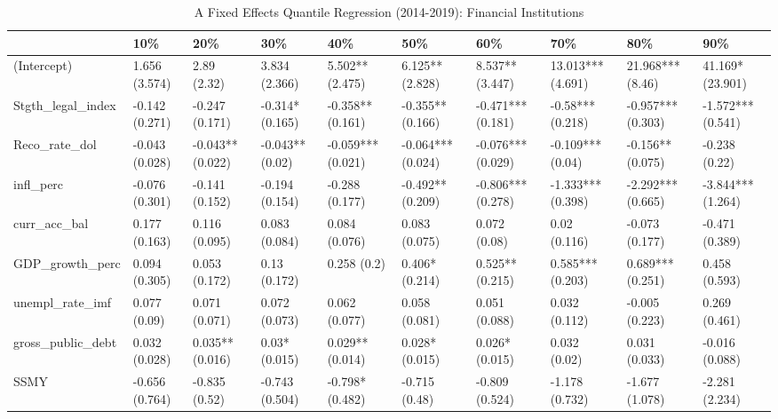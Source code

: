 \begin{table}[ht]
\centering
\caption{A Fixed Effects Quantile Regression (2014-2019): Financial Institutions} 
\begingroup\small
\begin{tabular}{llllllllll}
  \toprule
 & 10\% & 20\% & 30\% & 40\% & 50\% & 60\% & 70\% & 80\% & 90\% \\ 
  \midrule
(Intercept) & 1.656 (3.574) & 2.89 (2.32) & 3.834 (2.366) & 5.502** (2.475) & 6.125** (2.828) & 8.537** (3.447) & 13.013*** (4.691) & 21.968*** (8.46) & 41.169* (23.901) \\ 
  Stgth\_legal\_index & -0.142 (0.271) & -0.247 (0.171) & -0.314* (0.165) & -0.358** (0.161) & -0.355** (0.166) & -0.471*** (0.181) & -0.58*** (0.218) & -0.957*** (0.303) & -1.572*** (0.541) \\ 
  Reco\_rate\_dol & -0.043 (0.028) & -0.043** (0.022) & -0.043** (0.02) & -0.059*** (0.021) & -0.064*** (0.024) & -0.076*** (0.029) & -0.109*** (0.04) & -0.156** (0.075) & -0.238 (0.22) \\ 
  infl\_perc & -0.076 (0.301) & -0.141 (0.152) & -0.194 (0.154) & -0.288 (0.177) & -0.492** (0.209) & -0.806*** (0.278) & -1.333*** (0.398) & -2.292*** (0.665) & -3.844*** (1.264) \\ 
  curr\_acc\_bal & 0.177 (0.163) & 0.116 (0.095) & 0.083 (0.084) & 0.084 (0.076) & 0.083 (0.075) & 0.072 (0.08) & 0.02 (0.116) & -0.073 (0.177) & -0.471 (0.389) \\ 
  GDP\_growth\_perc & 0.094 (0.305) & 0.053 (0.172) & 0.13 (0.172) & 0.258 (0.2) & 0.406* (0.214) & 0.525** (0.215) & 0.585*** (0.203) & 0.689*** (0.251) & 0.458 (0.593) \\ 
  unempl\_rate\_imf & 0.077 (0.09) & 0.071 (0.071) & 0.072 (0.073) & 0.062 (0.077) & 0.058 (0.081) & 0.051 (0.088) & 0.032 (0.112) & -0.005 (0.223) & 0.269 (0.461) \\ 
  gross\_public\_debt & 0.032 (0.028) & 0.035** (0.016) & 0.03* (0.015) & 0.029** (0.014) & 0.028* (0.015) & 0.026* (0.015) & 0.032 (0.02) & 0.031 (0.033) & -0.016 (0.088) \\ 
  SSMY & -0.656 (0.764) & -0.835 (0.52) & -0.743 (0.504) & -0.798* (0.482) & -0.715 (0.48) & -0.809 (0.524) & -1.178 (0.732) & -1.677 (1.078) & -2.281 (2.234) \\ 
   \bottomrule
\end{tabular}
\endgroup
\end{table}
